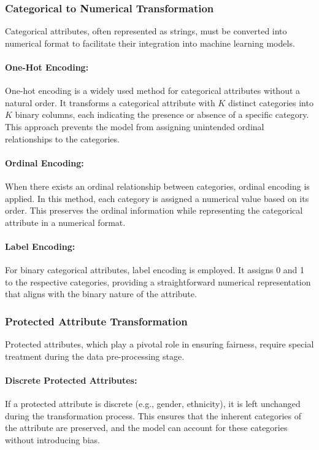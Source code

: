 \subsubsection{Categorical to Numerical Transformation}

Categorical attributes, often represented as strings, must be converted into numerical format to facilitate their integration into machine learning models.

\paragraph{One-Hot Encoding:}
One-hot encoding is a widely used method for categorical attributes without a natural order. It transforms a categorical attribute with \(K\) distinct categories into \(K\) binary columns, each indicating the presence or absence of a specific category. This approach prevents the model from assigning unintended ordinal relationships to the categories.

\paragraph{Ordinal Encoding:}
When there exists an ordinal relationship between categories, ordinal encoding is applied. In this method, each category is assigned a numerical value based on its order. This preserves the ordinal information while representing the categorical attribute in a numerical format.

\paragraph{Label Encoding:}
For binary categorical attributes, label encoding is employed. It assigns 0 and 1 to the respective categories, providing a straightforward numerical representation that aligns with the binary nature of the attribute.

\subsubsection{Protected Attribute Transformation}

Protected attributes, which play a pivotal role in ensuring fairness, require special treatment during the data pre-processing stage.

\paragraph{Discrete Protected Attributes:}
If a protected attribute is discrete (e.g., gender, ethnicity), it is left unchanged during the transformation process. This ensures that the inherent categories of the attribute are preserved, and the model can account for these categories without introducing bias.

